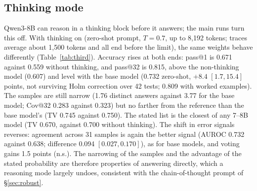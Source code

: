 \documentclass[wcp]{jmlr}
\begin{document}
\subsection{Thinking mode}\label{sec:thinking}
Qwen3-8B can reason in a thinking block before it answers; the main runs turn this off. With thinking on (zero-shot prompt, $T{=}0.7$, up to 8,192 tokens; traces average about 1,500 tokens and all end before the limit), the same weights behave differently (Table~\ref{tab:third}). Accuracy rises at both ends: pass@1 is 0.671 against 0.559 without thinking, and pass@32 is 0.815, above the non-thinking model (0.607) and level with the base model (0.732 zero-shot, $+8.4$ $[1.7,15.4]$ points, not surviving Holm correction over 42 tests; 0.809 with worked examples). The samples are still narrow (1.76 distinct answers against 3.77 for the base model; Cov@32 0.283 against 0.323) but no farther from the reference than the base model's (TV 0.745 against 0.750). The stated list is the closest of any 7--8B model (TV 0.670, against 0.700 without thinking). The shift in error signals reverses: agreement across 31 samples is again the better signal (AUROC 0.732 against 0.638; difference 0.094 $[0.027,0.170]$), as for base models, and voting gains 1.5 points (n.s.). The narrowing of the samples and the advantage of the stated probability are therefore properties of answering directly, which a reasoning mode largely undoes, consistent with the chain-of-thought prompt of \S\ref{sec:robust}.
\end{document}
